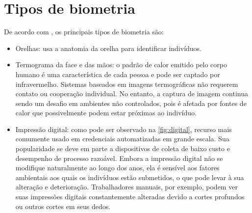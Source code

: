 \section{Tipos de biometria}\label{sec:tiposBiometria}

De acordo com , os principais tipos de biometria são:

\begin{itemize}
    \item Orelhas: usa a anatomia da orelha para identificar indivíduos.

    \item Termograma da face e das mãos: o padrão de calor emitido pelo corpo 
    humano é uma característica de cada pessoa e pode ser captado por 
    infravermelho. Sistemas baseados em imagens termográficas não requerem 
    contato ou cooperação individual. No entanto, a captura de imagem continua 
    sendo um desafio em ambientes não controlados, pois é afetada por fontes de 
    calor que possivelmente podem estar próximas ao indivíduo.

    \item Impressão digital: como pode ser observado na \autoref{fig:digital}, 
    recurso mais comumente usado em credenciais 
     automatizadas em grande escala.  Sua popularidade se deve em parte a 
     dispositivos de coleta de baixo custo e desempenho de processo razoável. 
     Embora a impressão digital não se modifique naturalmente ao longo dos anos, 
     ela é sensível aos fatores ambientais aos quais os indivíduos estão 
     submetidos, o que pode levar à sua alteração e deterioração. Trabalhadores 
     manuais, por exemplo, podem ver suas impressões digitais constantemente 
     alteradas devido a cortes profundos ou outros cortes em seus dedos.
     

\end{itemize}
